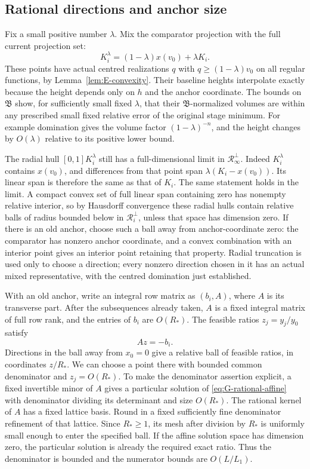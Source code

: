 \subsection{Rational directions and anchor size}\label{subsec:G-pin-directions}

Fix a small positive number $\lambda$.  Mix the comparator projection
with the full current projection set:
\[
                  K_i^\lambda=(1-\lambda)x(v_0)+\lambda K_i.
\]
These points have actual centred realizations $q$ with
$q\ge(1-\lambda)v_0$ on all regular functions, by Lemma~\ref{lem:E-convexity}.  Their baseline heights interpolate exactly because the
height depends only on $h$ and the anchor coordinate.  The bounds on
$\mathfrak B$ show, for sufficiently small fixed $\lambda$, that their
$\mathfrak B$-normalized volumes are within any prescribed small fixed
relative error of the original stage minimum.  For example domination
gives the volume factor $(1-\lambda)^{-n}$, and the height changes by
$O(\lambda)$ relative to its positive lower bound.

The radial hull $[0,1]K_i^\lambda$ still has a full-dimensional limit in
$\mathcal R_\infty^\perp$.  Indeed $K_i^\lambda$ contains $x(v_0)$,
and differences from that point span
$\lambda(K_i-x(v_0))$.  Its linear span is therefore the same as that of
$K_i$.  The same statement holds in the limit.  A compact convex set of
full linear span containing zero has nonempty relative interior, so by
Hausdorff convergence these radial hulls contain relative balls of
radius bounded below in $\mathcal R_i^\perp$, unless that space has
dimension zero.  If there is an old anchor, choose such a ball away from
anchor-coordinate zero: the comparator has nonzero anchor coordinate,
and a convex combination with an interior point gives an interior
point retaining that property.  Radial truncation is used only to choose
a direction; every nonzero direction chosen in it has an actual mixed
representative, with the centred domination just established.

With an old anchor, write an integral row matrix as $(b_i,A)$, where
$A$ is its transverse part.  After the subsequences already taken,
$A$ is a fixed integral matrix of full row rank, and the entries of
$b_i$ are $O(R_*)$.  The feasible ratios $z_j=y_j/y_0$ satisfy
\begin{equation}\label{eq:G-rational-affine}
                                Az=-b_i.
\end{equation}
Directions in the ball away from $x_0=0$ give a relative ball of feasible
ratios, in coordinates $z/R_*$.  We can choose a point there with bounded
common denominator and $z_j=O(R_*)$.  To make the denominator assertion
explicit, a fixed invertible minor of $A$ gives a particular solution of
\eqref{eq:G-rational-affine} with denominator dividing its determinant
and size $O(R_*)$.  The rational kernel of $A$ has a fixed lattice basis.
Round in a fixed sufficiently fine denominator refinement of that
lattice.  Since $R_*\ge1$, its mesh after division by $R_*$ is uniformly
small enough to enter the specified ball.  If the affine solution
space has dimension zero, the particular solution is already the
required exact ratio.  Thus the denominator is bounded and the numerator
bounds are $O(L/L_1)$.


